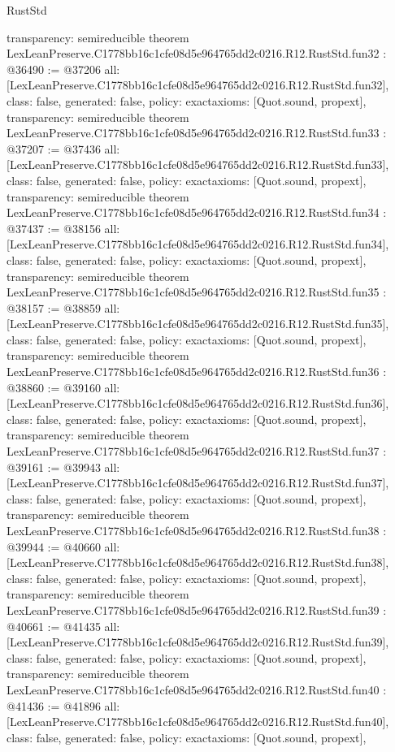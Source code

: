 \begin{lexlean}{RustStd}
\begin{coremodule}
{  transparency: semireducible
}
theorem LexLeanPreserve.C1778bb16c1cfe08d5e964765dd2c0216.R12.RustStd.fun32 : @36490 := @37206 {
  all: [LexLeanPreserve.C1778bb16c1cfe08d5e964765dd2c0216.R12.RustStd.fun32],
  class: false,
  generated: false,
  policy: exact{axioms: [Quot.sound, propext]},
  transparency: semireducible
}
theorem LexLeanPreserve.C1778bb16c1cfe08d5e964765dd2c0216.R12.RustStd.fun33 : @37207 := @37436 {
  all: [LexLeanPreserve.C1778bb16c1cfe08d5e964765dd2c0216.R12.RustStd.fun33],
  class: false,
  generated: false,
  policy: exact{axioms: [Quot.sound, propext]},
  transparency: semireducible
}
theorem LexLeanPreserve.C1778bb16c1cfe08d5e964765dd2c0216.R12.RustStd.fun34 : @37437 := @38156 {
  all: [LexLeanPreserve.C1778bb16c1cfe08d5e964765dd2c0216.R12.RustStd.fun34],
  class: false,
  generated: false,
  policy: exact{axioms: [Quot.sound, propext]},
  transparency: semireducible
}
theorem LexLeanPreserve.C1778bb16c1cfe08d5e964765dd2c0216.R12.RustStd.fun35 : @38157 := @38859 {
  all: [LexLeanPreserve.C1778bb16c1cfe08d5e964765dd2c0216.R12.RustStd.fun35],
  class: false,
  generated: false,
  policy: exact{axioms: [Quot.sound, propext]},
  transparency: semireducible
}
theorem LexLeanPreserve.C1778bb16c1cfe08d5e964765dd2c0216.R12.RustStd.fun36 : @38860 := @39160 {
  all: [LexLeanPreserve.C1778bb16c1cfe08d5e964765dd2c0216.R12.RustStd.fun36],
  class: false,
  generated: false,
  policy: exact{axioms: [Quot.sound, propext]},
  transparency: semireducible
}
theorem LexLeanPreserve.C1778bb16c1cfe08d5e964765dd2c0216.R12.RustStd.fun37 : @39161 := @39943 {
  all: [LexLeanPreserve.C1778bb16c1cfe08d5e964765dd2c0216.R12.RustStd.fun37],
  class: false,
  generated: false,
  policy: exact{axioms: [Quot.sound, propext]},
  transparency: semireducible
}
theorem LexLeanPreserve.C1778bb16c1cfe08d5e964765dd2c0216.R12.RustStd.fun38 : @39944 := @40660 {
  all: [LexLeanPreserve.C1778bb16c1cfe08d5e964765dd2c0216.R12.RustStd.fun38],
  class: false,
  generated: false,
  policy: exact{axioms: [Quot.sound, propext]},
  transparency: semireducible
}
theorem LexLeanPreserve.C1778bb16c1cfe08d5e964765dd2c0216.R12.RustStd.fun39 : @40661 := @41435 {
  all: [LexLeanPreserve.C1778bb16c1cfe08d5e964765dd2c0216.R12.RustStd.fun39],
  class: false,
  generated: false,
  policy: exact{axioms: [Quot.sound, propext]},
  transparency: semireducible
}
theorem LexLeanPreserve.C1778bb16c1cfe08d5e964765dd2c0216.R12.RustStd.fun40 : @41436 := @41896 {
  all: [LexLeanPreserve.C1778bb16c1cfe08d5e964765dd2c0216.R12.RustStd.fun40],
  class: false,
  generated: false,
  policy: exact{axioms: [Quot.sound, propext]},
}
\end{coremodule}
\end{lexlean}
